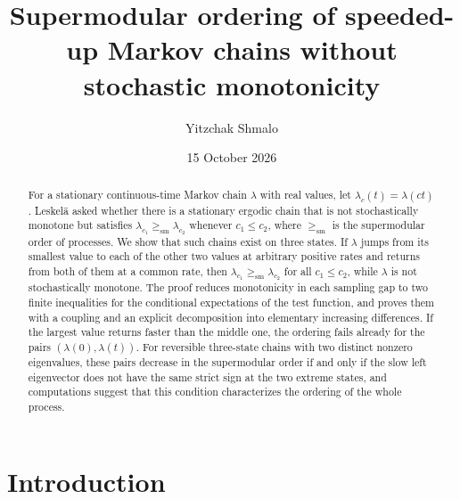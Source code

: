 \documentclass[11pt]{amsart}
\title[Supermodular ordering without stochastic monotonicity]{Supermodular ordering of speeded-up Markov chains without stochastic monotonicity}
\author{Yitzchak Shmalo}
\date{15 October 2026}
\theoremstyle{remark}
\numberwithin{equation}{section}
\newcommand{\1}{\mathbf 1}
\newcommand{\sm}{\mathrm{sm}}
\begin{document}
\begin{abstract}
For a stationary continuous-time Markov chain $\lambda$ with real values, let $\lambda_c(t)=\lambda(ct)$. Leskel\"a asked whether there is a stationary ergodic chain that is not stochastically monotone but satisfies $\lambda_{c_1}\ge_\sm\lambda_{c_2}$ whenever $c_1\le c_2$, where $\ge_\sm$ is the supermodular order of processes. We show that such chains exist on three states. If $\lambda$ jumps from its smallest value to each of the other two values at arbitrary positive rates and returns from both of them at a common rate, then $\lambda_{c_1}\ge_\sm\lambda_{c_2}$ for all $c_1\le c_2$, while $\lambda$ is not stochastically monotone. The proof reduces monotonicity in each sampling gap to two finite inequalities for the conditional expectations of the test function, and proves them with a coupling and an explicit decomposition into elementary increasing differences. If the largest value returns faster than the middle one, the ordering fails already for the pairs $(\lambda(0),\lambda(t))$. For reversible three-state chains with two distinct nonzero eigenvalues, these pairs decrease in the supermodular order if and only if the slow left eigenvector does not have the same strict sign at the two extreme states, and computations suggest that this condition characterizes the ordering of the whole process.
\end{abstract}
\maketitle

\section{Introduction}\label{sec:intro}
\end{document}
